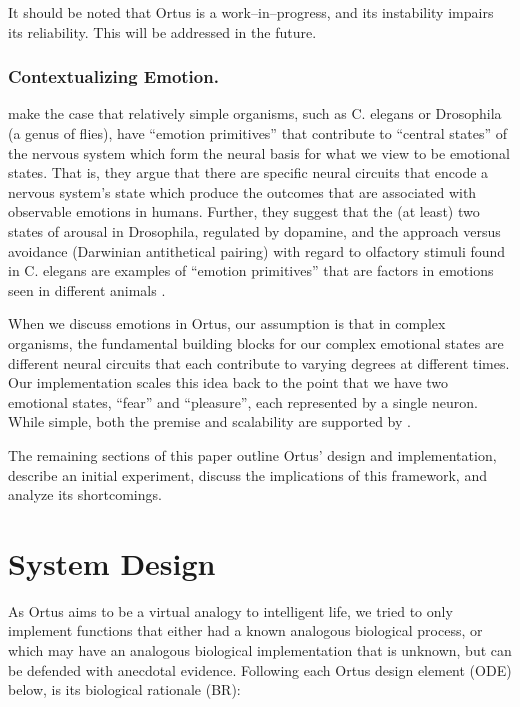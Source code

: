 \documentclass[letterpaper]{article}
\begin{document}
It should be noted that Ortus is a work--in--progress, and its instability impairs its reliability. This will be addressed in the future.

\subsubsection{Contextualizing Emotion.}

\citet{Anderson2014} make the case that relatively simple organisms, such as C. elegans or Drosophila (a genus of flies), have ``emotion primitives'' that contribute to ``central states'' of the nervous system which form the neural basis for what we view to be emotional states.
That is, they argue that there are specific neural circuits that encode a nervous system's state which produce the outcomes that are associated with observable emotions in humans.
Further, they suggest that the (at least) two states of arousal in Drosophila, regulated by dopamine, and the approach versus avoidance (Darwinian antithetical pairing) with regard to olfactory stimuli found in C. elegans are examples of ``emotion primitives'' that are factors in emotions seen in different animals \citep{Anderson2014}.

When we discuss emotions in Ortus, our assumption is that in complex organisms, the fundamental building blocks for our complex emotional states are different neural circuits that each contribute to varying degrees at different times.
Our implementation scales this idea back to the point that we have two emotional states, ``fear'' and ``pleasure'', each represented by a single neuron. While simple, both the premise and scalability are supported by \citet{Anderson2014}.

The remaining sections of this paper outline Ortus' design and implementation, describe an initial experiment, discuss the implications of this framework, and analyze its shortcomings.

\section{System Design}


As Ortus aims to be a virtual analogy to intelligent life, we tried to only implement functions that either had a known analogous biological process, or which may have an analogous biological implementation that is unknown, but can be defended with anecdotal evidence. Following each Ortus design element (ODE) below, is its biological rationale (BR):
\end{document}
